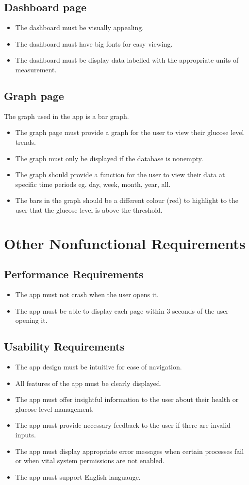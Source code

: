 \documentclass[a4paper]{scrreprt}
\begin{document}
\section{Dashboard page}
\begin{itemize}
    \item The dashboard must be visually appealing.
    \item The dashboard must have big fonts for easy viewing.
    \item The dashboard must be display data labelled with the appropriate units of measurement.
\end{itemize}
\section{Graph page}
The graph used in the app is a bar graph.
\begin{itemize}
    \item The graph page must provide a graph for the user to view their glucose level trends.
    \item The graph must only be displayed if the database is nonempty.
    \item The graph should provide a function for the user to view their data at specific time periods eg. day, week, month, year, all.
    \item The bars in the graph should be a different colour (red) to highlight to the user that the glucose level is above the threshold.
\end{itemize}

\chapter{Other Nonfunctional Requirements}
\section{Performance Requirements}
\begin{itemize}
    \item The app must not crash when the user opens it.
    \item The app must be able to display each page within 3 seconds of the user opening it.
\end{itemize}
\section{Usability Requirements}
\begin{itemize}
    \item The app design must be intuitive for ease of navigation.
    \item All features of the app must be clearly displayed.
    \item The app must offer insightful information to the user about their health or glucose level management.
    \item The app must provide necessary feedback to the user if there are invalid inputs.
    \item The app must display appropriate error messages when certain processes fail or when vital system permissions are not enabled.
    \item The app must support English languauge.
\end{itemize}
\end{document}
